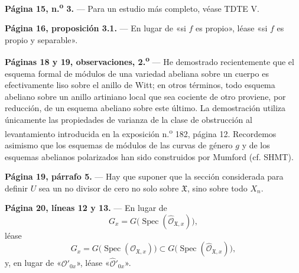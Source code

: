 \documentclass[11pt,twoside,openany]{book}
\numberwithin{equation}{section}
\newcommand{\src}[1]{%
  \phantomsection\hypertarget{src:#1}{}%
  \marginpar{\raggedleft\footnotesize\sffamily #1}%
}
\theoremstyle{plain}
\theoremstyle{definition}
\theoremstyle{remark}
\newcommand{\FgaUnitKey}{frontmatter}
\renewcommand{\src}[1]{%
  \phantomsection\hypertarget{src:\FgaUnitKey:#1}{}%
  \marginpar{\raggedleft\footnotesize\sffamily #1}%
}
\theoremstyle{plain}
\theoremstyle{definition}
\theoremstyle{remark}
\begin{document}
\src{301}
\noindent\textbf{Página 15, n.\textsuperscript{o} 3.} --- Para un estudio más
completo, véase TDTE V.

\noindent\textbf{Página 16, proposición 3.1.} --- En lugar de «si $f$ es
propio», léase «si $f$ es propio y separable».

\noindent\textbf{Páginas 18 y 19, observaciones, 2.\textsuperscript{o}} --- He
demostrado recientemente que el esquema formal de módulos de una variedad
abeliana sobre un cuerpo es efectivamente liso sobre el anillo de Witt; en
otros términos, todo esquema abeliano sobre un anillo artiniano local que sea
cociente de otro proviene, por reducción, de un esquema abeliano sobre este
último. La demostración utiliza únicamente las propiedades de varianza de la
clase de obstrucción al levantamiento introducida en la exposición
n.\textsuperscript{o} 182, página 12. Recordemos asimismo que los esquemas de
módulos de las curvas de género $g$ y de los esquemas abelianos polarizados han
sido construidos por Mumford (cf. SHMT).

\noindent\textbf{Página 19, párrafo 5.} --- Hay que suponer que la sección
considerada para definir $U$ sea un no divisor de cero no solo sobre
$\mathfrak X$, sino sobre todo $X_n$.

\noindent\textbf{Página 20, líneas 12 y 13.} --- En lugar de
\[
  G_x=G\bigl(\operatorname{Spec}(\widehat{\mathcal O}_{\mathfrak X,x})\bigr),
\]
léase
\[
  G_x=G\bigl(\operatorname{Spec}(\mathcal O_{\mathfrak X,x})\bigr)
  \subset
  G\bigl(\operatorname{Spec}(\widehat{\mathcal O}_{\mathfrak X,x})\bigr),
\]
y, en lugar de «$\mathcal O'_{0x}$», léase
«$\widehat{\mathcal O}'_{0x}$».
\end{document}
